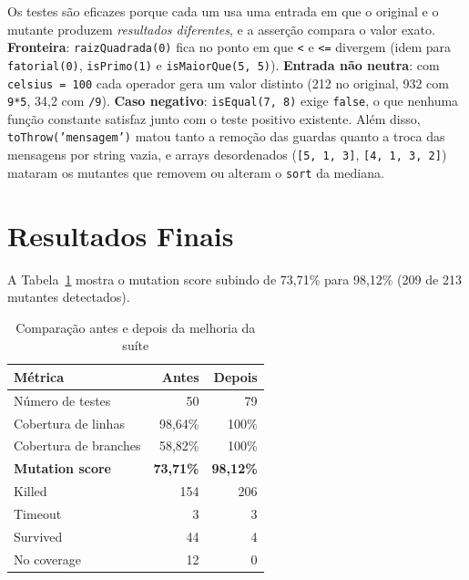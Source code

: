 \documentclass[12pt,oneside,a4paper,article,english,brazil]{abntex2}
\begin{document}
Os testes são eficazes porque cada um usa uma entrada em que o original e o
mutante produzem \emph{resultados diferentes}, e a asserção compara o valor
exato. \textbf{Fronteira}: \texttt{raizQuadrada(0)} fica no ponto em que
\texttt{<} e \texttt{<=} divergem (idem para \texttt{fatorial(0)},
\texttt{isPrimo(1)} e \texttt{isMaiorQue(5, 5)}). \textbf{Entrada não neutra}:
com \texttt{celsius = 100} cada operador gera um valor distinto (212 no
original, 932 com \texttt{9*5}, 34,2 com \texttt{/9}). \textbf{Caso negativo}:
\texttt{isEqual(7, 8)} exige \texttt{false}, o que nenhuma função constante
satisfaz junto com o teste positivo existente. Além disso,
\texttt{toThrow('mensagem')} matou tanto a remoção das guardas quanto a troca
das mensagens por string vazia, e arrays desordenados (\texttt{[5, 1, 3]},
\texttt{[4, 1, 3, 2]}) mataram os mutantes que removem ou alteram o
\texttt{sort} da mediana.

\section{Resultados Finais}

A Tabela~\ref{tab:final} mostra o mutation score subindo de 73,71\% para
98,12\% (209 de 213 mutantes detectados).

\begin{table}[htbp]
  \centering
  \caption{Comparação antes e depois da melhoria da suíte}
  \label{tab:final}
  \begin{tabular}{lrr}
    \toprule
    Métrica & Antes & Depois \\
    \midrule
    Número de testes          & 50      & 79 \\
    Cobertura de linhas       & 98,64\% & 100\% \\
    Cobertura de branches     & 58,82\% & 100\% \\
    \textbf{Mutation score}   & \textbf{73,71\%} & \textbf{98,12\%} \\
    Killed                    & 154     & 206 \\
    Timeout                   & 3       & 3 \\
    Survived                  & 44      & 4 \\
    No coverage               & 12      & 0 \\
    \bottomrule
  \end{tabular}
\end{table}
\end{document}
